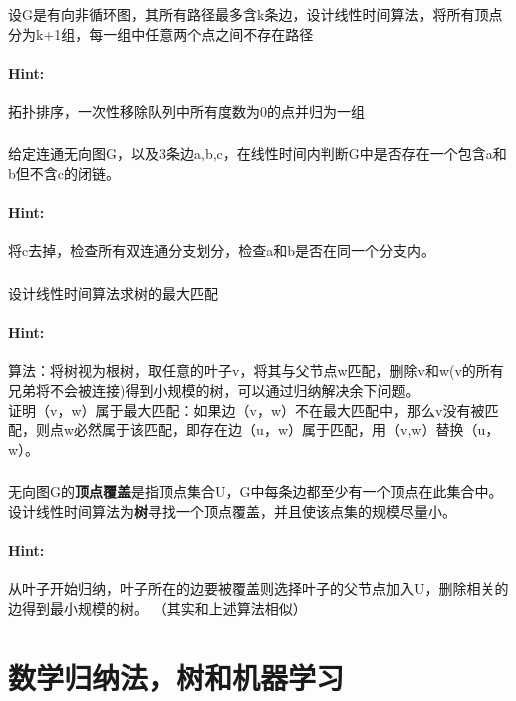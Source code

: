 \documentclass{article}
\begin{document}
     \subsubsection{}设G是有向非循环图，其所有路径最多含k条边，设计线性时间算法，将所有顶点分为k+1组，每一组中任意两个点之间不存在路径
     \paragraph{Hint:}拓扑排序，一次性移除队列中所有度数为0的点并归为一组
     
     \subsubsection{}给定连通无向图G，以及3条边a,b,c，在线性时间内判断G中是否存在一个包含a和b但不含c的闭链。
     \paragraph{Hint:}将c去掉，检查所有双连通分支划分，检查a和b是否在同一个分支内。
     
     \subsubsection{}设计线性时间算法求树的最大匹配
     \paragraph{Hint:}算法：将树视为根树，取任意的叶子v，将其与父节点w匹配，删除v和w(v的所有兄弟将不会被连接)得到小规模的树，可以通过归纳解决余下问题。\\
     证明（v，w）属于最大匹配：如果边（v，w）不在最大匹配中，那么v没有被匹配，则点w必然属于该匹配，即存在边（u，w）属于匹配，用（v,w）替换（u，w）。
     
     \subsubsection{}无向图G的\textbf{顶点覆盖}是指顶点集合U，G中每条边都至少有一个顶点在此集合中。设计线性时间算法为\textbf{树}寻找一个顶点覆盖，并且使该点集的规模尽量小。
     \paragraph{Hint:}从叶子开始归纳，叶子所在的边要被覆盖则选择叶子的父节点加入U，删除相关的边得到最小规模的树。 （其实和上述算法相似）
     
     \section{数学归纳法，树和机器学习}
\end{document}
